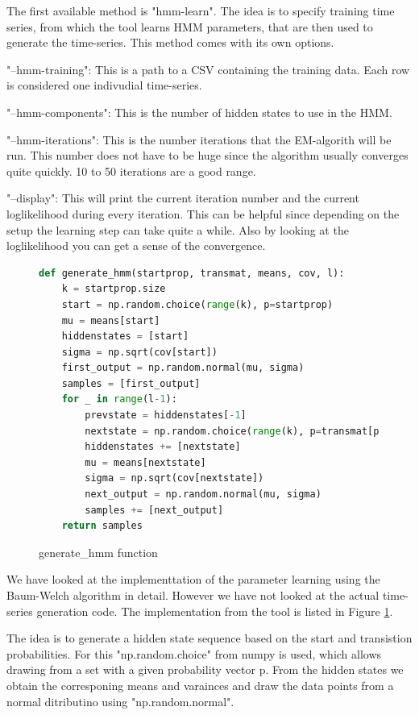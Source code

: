 The first available method is "hmm-learn". The idea is to specify training time series, from which the tool learns HMM parameters, that are then used to generate the time-series. This method comes with its own options. 

"--hmm-training": This is a path to a CSV containing the training data. Each row is considered one indivudial time-series. 

"--hmm-components": This is the number of hidden states to use in the HMM. 

"--hmm-iterations": This is the number iterations that the EM-algorith will be run. This number does not have to be huge since the algorithm usually converges quite quickly. 10 to 50 iterations are a good range. 

"--display": This will print the current iteration number and the current loglikelihood during every iteration. This can be helpful since depending on the setup the learning step can take quite a while. Also by looking at the loglikelihood you can get a sense of the convergence. 

\begin{figure}
\begin{singlespace}
\begin{lstlisting}[language=Python]
def generate_hmm(startprop, transmat, means, cov, l):
    k = startprop.size
    start = np.random.choice(range(k), p=startprop)
    mu = means[start]
    hiddenstates = [start]
    sigma = np.sqrt(cov[start])
    first_output = np.random.normal(mu, sigma)
    samples = [first_output]
    for _ in range(l-1):
        prevstate = hiddenstates[-1]
        nextstate = np.random.choice(range(k), p=transmat[prevstate])
        hiddenstates += [nextstate]
        mu = means[nextstate]
        sigma = np.sqrt(cov[nextstate])
        next_output = np.random.normal(mu, sigma)
        samples += [next_output]
    return samples
\end{lstlisting}
\end{singlespace}
\caption{generate\_hmm function}    
\label{fig:hmm-generate}
\end{figure}

We have looked at the implementtation of the parameter learning using the Baum-Welch algorithm in detail. However we have not looked at the actual time-series generation code. The implementation from the tool is listed in Figure \ref{fig:hmm-generate}. 

The idea is to generate a hidden state sequence based on the start and transistion probabilities. For this "np.random.choice" from numpy is used, which allows drawing from a set with a given probability vector p. From the hidden states we obtain the corresponing means and varainces and draw the data points from a normal ditributino using "np.random.normal". 

